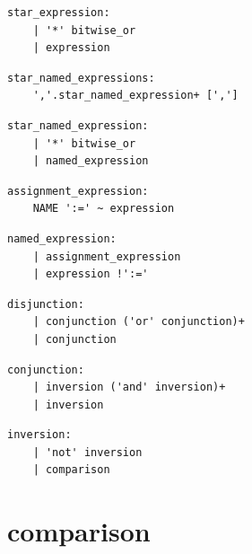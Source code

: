 \noindent\textbf{\texttt{}}\par
\begin{lstlisting}
star_expression:
    | '*' bitwise_or
    | expression
\end{lstlisting}

\noindent\textbf{\texttt{}}\par
\begin{lstlisting}
star_named_expressions:
    ','.star_named_expression+ [',']
\end{lstlisting}

\noindent\textbf{\texttt{}}\par
\begin{lstlisting}
star_named_expression:
    | '*' bitwise_or
    | named_expression
\end{lstlisting}

\noindent\textbf{\texttt{}}\par
\begin{lstlisting}
assignment_expression:
    NAME ':=' ~ expression
\end{lstlisting}

\noindent\textbf{\texttt{}}\par
\begin{lstlisting}
named_expression:
    | assignment_expression
    | expression !':='
\end{lstlisting}

\noindent\textbf{\texttt{}}\par
\begin{lstlisting}
disjunction:
    | conjunction ('or' conjunction)+
    | conjunction
\end{lstlisting}

\noindent\textbf{\texttt{}}\par
\begin{lstlisting}
conjunction:
    | inversion ('and' inversion)+
    | inversion
\end{lstlisting}

\noindent\textbf{\texttt{}}\par
\begin{lstlisting}
inversion:
    | 'not' inversion
    | comparison
\end{lstlisting}

\section{comparison}

